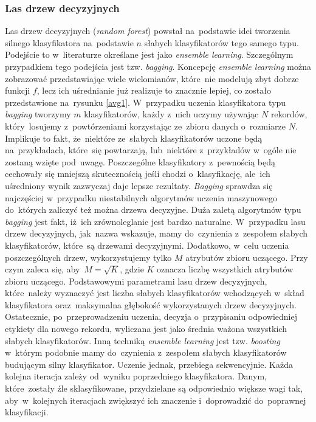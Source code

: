 \subsubsection{Las drzew decyzyjnych}
Las drzew decyzyjnych (\textit{random forest}) powstał na~podstawie idei tworzenia silnego klasyfikatora na~podstawie $n$ słabych klasyfikatorów tego samego typu. Podejście to w~literaturze określane jest jako \textit{ensemble learning}\cite{drucker1993improving}. Szczególnym przypadkiem tego podejścia jest tzw. \textit{bagging}\cite{gonczarek}. Koncepcję \textit{ensemble learning} można zobrazować przedstawiając wiele wielomianów, które~nie modelują zbyt dobrze funkcji $f$, lecz ich uśrednianie już realizuje to znacznie lepiej, co zostało przedstawione na~rysunku \ref{avg1}.  W~przypadku uczenia klasyfikatora typu \textit{bagging} tworzymy $m$ klasyfikatorów, każdy z~nich uczymy używając $N$ rekordów, który~losujemy z~powtórzeniami korzystając ze~zbioru danych o~rozmiarze $N$. Implikuje to fakt, że~niektóre ze~słabych klasyfikatorów uczone będą na~przykładach, które~się powtarzają, lub~niektóre z~przykładów w~ogóle nie zostaną wzięte pod~uwagę. Poszczególne klasyfikatory z~pewnością będą cechowały się mniejszą skutecznością jeśli chodzi o~klasyfikację, ale~ich uśredniony wynik zazwyczaj daje lepsze rezultaty. \textit{Bagging} sprawdza się najczęściej w~przypadku niestabilnych algorytmów uczenia maszynowego do~których zaliczyć też można drzewa decyzyjne\cite{ensemble}. Duża zaletą algorytmów typu \textit{bagging} jest fakt, iż~ich zrównoleglanie jest bardzo naturalne.
W~przypadku lasu drzew decyzyjnych, jak~nazwa wskazuje, mamy do~czynienia z~zespołem słabych klasyfikatorów, które~są drzewami decyzyjnymi. Dodatkowo, w~celu uczenia poszczególnych drzew, wykorzystujemy tylko $M$ atrybutów zbioru uczącego. Przy czym zaleca się, aby~$M=\sqrt{K}$, gdzie $K$ oznacza liczbę wszystkich atrybutów zbioru uczącego. Podstawowymi parametrami lasu drzew decyzyjnych, które~należy wyznaczyć jest liczba słabych klasyfikatorów wchodzących w~skład klasyfikatora oraz~maksymalna głębokość wykorzystanych drzew decyzyjnych. Ostatecznie, po~przeprowadzeniu uczenia, decyzja o~przypisaniu odpowiedniej etykiety dla nowego rekordu, wyliczana jest jako średnia ważona wszystkich słabych klasyfikatorów. Inną techniką \textit{ensemble learning} jest tzw. \textit{boosting}\cite{drucker1996boosting} w~którym podobnie mamy do~czynienia z~zespołem słabych klasyfikatorów budującym silny klasyfikator. Uczenie jednak, przebiega sekwencyjnie. Każda kolejna iteracja zależy od~wyniku poprzedniego klasyfikatora. Danym, które~zostały źle sklasyfikowane, przydzielane są odpowiednio większe wagi tak, aby~w~kolejnych iteracjach zwiększyć ich znaczenie i~doprowadzić do~poprawnej klasyfikacji.

